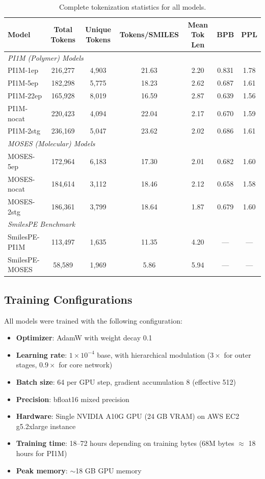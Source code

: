 \documentclass{article}
\newcommand{\bpb}{BPB}
\newcommand{\ppl}{PPL}
\begin{document}
\begin{table}[h]
\caption{Complete tokenization statistics for all models.}
\label{tab:complete}
\begin{center}
\begin{tabular}{lcccccc}
\toprule
Model & Total Tokens & Unique Tokens & Tokens/SMILES & Mean Tok Len & \bpb{} & \ppl{} \\
\midrule
\multicolumn{7}{l}{\textit{PI1M (Polymer) Models}} \\
PI1M-1ep & 216,277 & 4,903 & 21.63 & 2.20 & 0.831 & 1.78 \\
PI1M-5ep & 182,298 & 5,775 & 18.23 & 2.62 & 0.687 & 1.61 \\
PI1M-22ep & 165,928 & 8,019 & 16.59 & 2.87 & 0.639 & 1.56 \\
PI1M-nocat & 220,423 & 4,094 & 22.04 & 2.17 & 0.670 & 1.59 \\
PI1M-2stg & 236,169 & 5,047 & 23.62 & 2.02 & 0.686 & 1.61 \\
\midrule
\multicolumn{7}{l}{\textit{MOSES (Molecular) Models}} \\
MOSES-5ep & 172,964 & 6,183 & 17.30 & 2.01 & 0.682 & 1.60 \\
MOSES-nocat & 184,614 & 3,112 & 18.46 & 2.12 & 0.658 & 1.58 \\
MOSES-2stg & 186,361 & 3,799 & 18.64 & 1.87 & 0.679 & 1.60 \\
\midrule
\multicolumn{7}{l}{\textit{SmilesPE Benchmark}} \\
SmilesPE-PI1M & 113,497 & 1,635 & 11.35 & 4.20 & --- & --- \\
SmilesPE-MOSES & 58,589 & 1,969 & 5.86 & 5.94 & --- & --- \\
\bottomrule
\end{tabular}
\end{center}
\end{table}


\subsection{Training Configurations}

All models were trained with the following configuration:
\begin{itemize}
    \item \textbf{Optimizer}: AdamW with weight decay 0.1
    \item \textbf{Learning rate}: $1 \times 10^{-4}$ base, with hierarchical modulation ($3\times$ for outer stages, $0.9\times$ for core network)
    \item \textbf{Batch size}: 64 per GPU step, gradient accumulation 8 (effective 512)
    \item \textbf{Precision}: bfloat16 mixed precision
    \item \textbf{Hardware}: Single NVIDIA A10G GPU (24 GB VRAM) on AWS EC2 g5.2xlarge instance
    \item \textbf{Training time}: 18--72 hours depending on training bytes (68M bytes $\approx$ 18 hours for PI1M)
    \item \textbf{Peak memory}: $\sim$18 GB GPU memory
\end{itemize}
\end{document}
